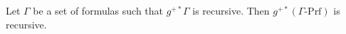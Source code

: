 Let $\Gamma$ be a set of formulas such that $g^{+*} \Gamma$ is recursive. Then $g^{+*}(\Gamma\text{-Prf})$ is recursive.
